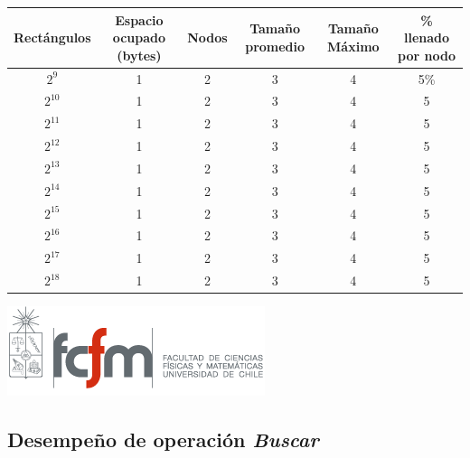 \documentclass[letterpaper,10pt]{article}
\begin{document}
	\begin{center}

		\begin{tabular}{|c|c|c|c|c|c|}
			\hline
			Rectángulos	& Espacio ocupado (bytes) & Nodos & Tamaño promedio & Tamaño Máximo & \% llenado por nodo\\
			\hline
			$2^{9}$ 	& 1 & 2 & 3 & 4 & 5\%\\
			\hline
			$2^{10}$ 	& 1 & 2 & 3 & 4 & 5\\
			\hline
			$2^{11}$ 	& 1 & 2 & 3 & 4 & 5\\
			\hline
			$2^{12}$ 	& 1 & 2 & 3 & 4 & 5\\
			\hline
			$2^{13}$ 	& 1 & 2 & 3 & 4 & 5\\
			\hline
			$2^{14}$ 	& 1 & 2 & 3 & 4 & 5\\
			\hline
			$2^{15}$ 	& 1 & 2 & 3 & 4 & 5\\
			\hline
			$2^{16}$ 	& 1 & 2 & 3 & 4 & 5\\
			\hline
			$2^{17}$ 	& 1 & 2 & 3 & 4 & 5\\
			\hline
			$2^{18}$ 	& 1 & 2 & 3 & 4 & 5\\
			\hline
		\end{tabular}

		\includegraphics{logoFCFM.png}
	\end{center}

	\subsection{Desempeño de operación \textit{Buscar}}
\end{document}
